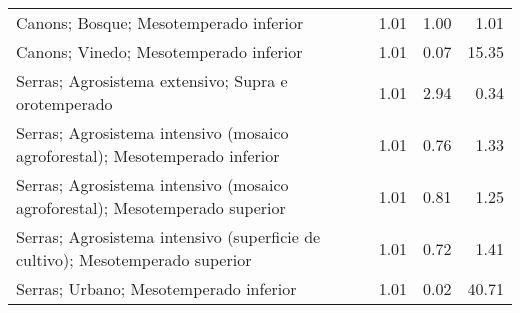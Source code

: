 \begin{table}[p]
\begin{tabular}{lrrr}
  Canons; Bosque; Mesotemperado inferior & 1.01 & 1.00 & 1.01 \\ 
  Canons; Vinedo; Mesotemperado inferior & 1.01 & 0.07 & 15.35 \\ 
  Serras; Agrosistema extensivo; Supra e orotemperado & 1.01 & 2.94 & 0.34 \\ 
  Serras; Agrosistema intensivo (mosaico agroforestal); Mesotemperado inferior & 1.01 & 0.76 & 1.33 \\ 
  Serras; Agrosistema intensivo (mosaico agroforestal); Mesotemperado superior & 1.01 & 0.81 & 1.25 \\ 
  Serras; Agrosistema intensivo (superficie de cultivo); Mesotemperado superior & 1.01 & 0.72 & 1.41 \\ 
  Serras; Urbano; Mesotemperado inferior & 1.01 & 0.02 & 40.71 \\ 
   \hline
\end{tabular}
\end{table}
